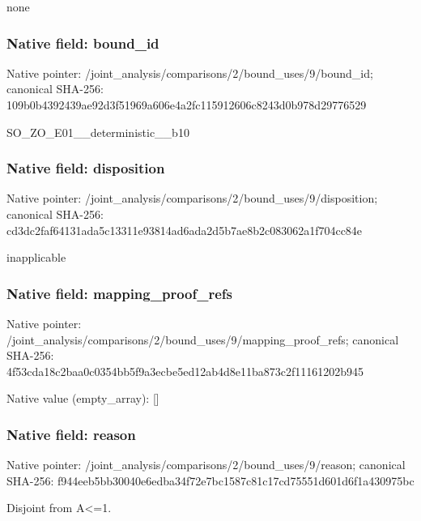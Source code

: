 \documentclass[10pt,a4paper]{article}
\begin{document}
\begingroup\raggedright\sloppy none\par\endgroup

\subsubsection{Native field: bound\_\allowbreak{}id}
Native pointer: /joint\_\allowbreak{}analysis/comparisons/2/bound\_\allowbreak{}uses/9/bound\_\allowbreak{}id; canonical SHA-256: 109b0b4392439ae92d3f51969a606e4a2fc115912606c8243d0b978d29776529

\begingroup\raggedright\sloppy SO\_\allowbreak{}ZO\_\allowbreak{}E01\_\allowbreak{}\_\allowbreak{}deterministic\_\allowbreak{}\_\allowbreak{}b10\par\endgroup

\subsubsection{Native field: disposition}
Native pointer: /joint\_\allowbreak{}analysis/comparisons/2/bound\_\allowbreak{}uses/9/disposition; canonical SHA-256: cd3dc2faf64131ada5c13311e93814ad6ada2d5b7ae8b2c083062a1f704cc84e

\begingroup\raggedright\sloppy inapplicable\par\endgroup

\subsubsection{Native field: mapping\_\allowbreak{}proof\_\allowbreak{}refs}
Native pointer: /joint\_\allowbreak{}analysis/comparisons/2/bound\_\allowbreak{}uses/9/mapping\_\allowbreak{}proof\_\allowbreak{}refs; canonical SHA-256: 4f53cda18c2baa0c0354bb5f9a3ecbe5ed12ab4d8e11ba873c2f11161202b945

Native value (empty\_\allowbreak{}array): []

\subsubsection{Native field: reason}
Native pointer: /joint\_\allowbreak{}analysis/comparisons/2/bound\_\allowbreak{}uses/9/reason; canonical SHA-256: f944eeb5bb30040e6edba34f72e7bc1587c81c17cd75551d601d6f1a430975bc

\begingroup\raggedright\sloppy Disjoint from A<=\allowbreak{}1.\par\endgroup
\end{document}
